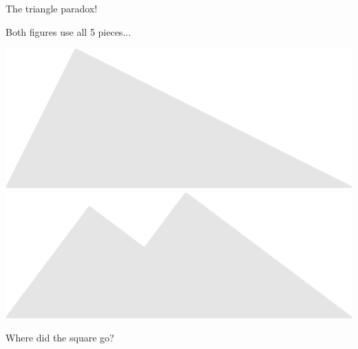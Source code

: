 \documentclass[14pt]{beamer}
\begin{document}
    \begin{frame}{The triangle paradox!}
        \begin{center}
            Both figures use all 5 pieces...

            \vspace{50pt}

            \includegraphics[scale=0.45]{figures/figure029l.pdf}\!\!\!
            \includegraphics[scale=0.45]{figures/figure026v.pdf}\;\;

            \vspace{32pt}

            Where did the square go?
        \end{center}
    \end{frame}

\end{document}
